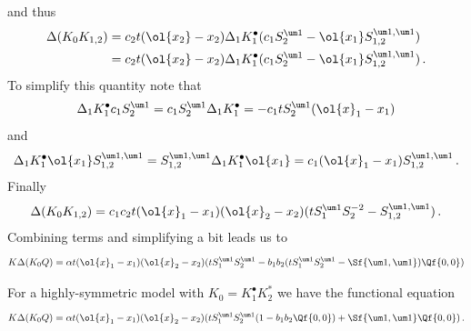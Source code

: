 and thus
\begin{align}\begin{split}
	\Delta(K_0 K_{1,2})  &= c_2t(\ol{x_2}-x_2) \Delta_1 K_1^\bullet (c_1S_2^{\um 1}-\ol{x_1}S_{1,2}^{\um 1, \um 1})\\
	&=c_2t(\ol{x_2}-x_2) \Delta_1 K_1^\bullet (c_1S_2^{\um 1}-\ol{x_1}S_{1,2}^{\um 1, \um 1})\,.
\end{split}\end{align}
To simplify this quantity note that
\begin{align}
\Delta_1 K_1^\bullet c_1 S_2^{\um 1} = c_1 S_2^{\um 1}\Delta_1 K_1^\bullet = -c_1t S_2^{\um 1}(\ol{x}_1-x_1)
\end{align}
and
\begin{align}
	\Delta_1 K_1^\bullet \ol{x_1}S_{1,2}^{\um 1, \um 1} = S_{1,2}^{\um 1, \um 1}\Delta_1 K_1^\bullet \ol{x_1} = c_1 (\ol{x}_1-x_1)S_{1,2}^{\um 1, \um 1}\,.
\end{align}
Finally
\begin{align}
	\Delta(K_0 K_{1,2}) = c_1c_2t(\ol{x}_1-x_1)(\ol{x}_2-x_2)(t S_1^{\um 1} S_2^{-2}-S_{1,2}^{\um 1, \um 1})\,.
\end{align}
Combining terms and simplifying a bit leads us to
\begin{align}
	K\Delta(K_0 Q) = \alpha t(\ol{x}_1-x_1)(\ol{x}_2-x_2)(tS_1^{\um 1}S_2^{\um 1} - b_1b_2(tS_1^{\um 1}S_2^{\um 1}-\Sf{\um 1, \um 1})\Qf{0,0})
\end{align}
\begin{corollary} For a highly-symmetric model with $K_0 = K_1^\bullet K_2^\ast$ we have the functional equation
\begin{align}
	K\Delta(K_0 Q) = \alpha t(\ol{x}_1-x_1)(\ol{x}_2-x_2)(tS_1^{\um 1}S_2^{\um 1}(1 - b_1b_2\Qf{0,0}) + \Sf{\um 1, \um 1}\Qf{0,0})\,.
\end{align}
\end{corollary}
